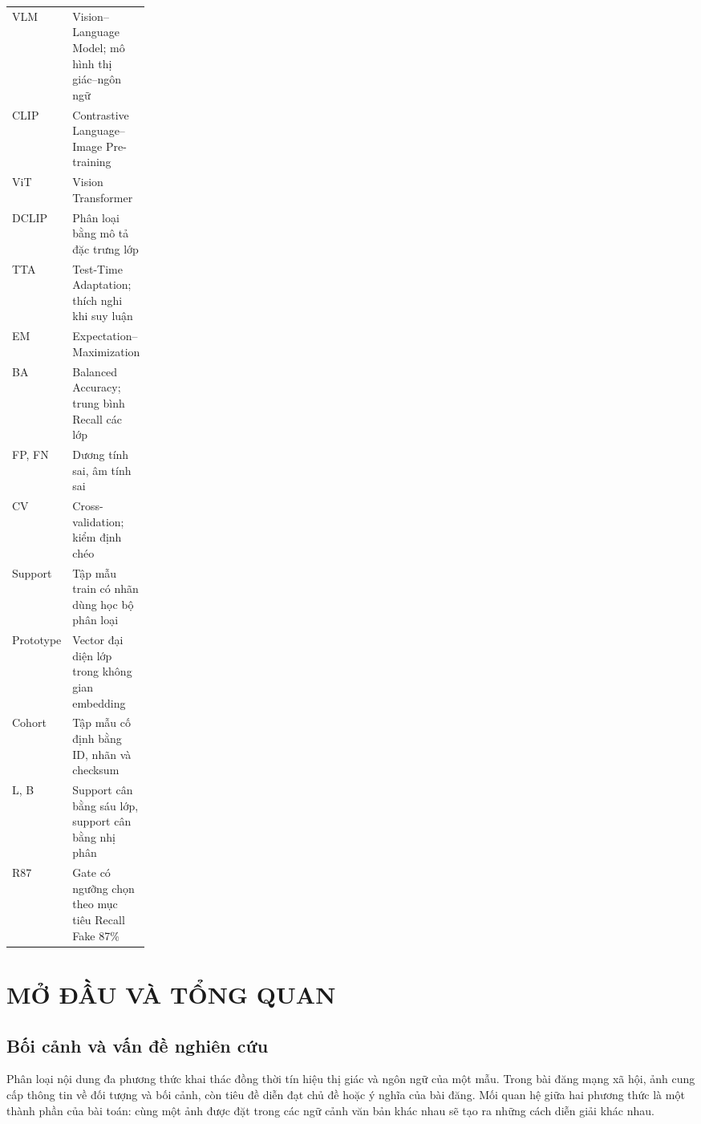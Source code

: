 \documentclass[12pt,a4paper]{article}
\newcommand{\Chapter}[1]{\clearpage\section{#1}}
\numberwithin{figure}{section}
\numberwithin{table}{section}
\numberwithin{equation}{section}
\newcommand{\DauTrangDau}[1]{\FrontHeading*{#1}}
\begin{document}
\DauTrangDau{DANH MỤC CÁC CHỮ VIẾT TẮT}
\begin{tabularx}{\linewidth}{@{}p{0.20\linewidth}L@{}}
\toprule
VLM & Vision--Language Model; mô hình thị giác--ngôn ngữ\\
CLIP & Contrastive Language--Image Pre-training\\
ViT & Vision Transformer\\
DCLIP & Phân loại bằng mô tả đặc trưng lớp\\
TTA & Test-Time Adaptation; thích nghi khi suy luận\\
EM & Expectation--Maximization\\
BA & Balanced Accuracy; trung bình Recall các lớp\\
FP, FN & Dương tính sai, âm tính sai\\
CV & Cross-validation; kiểm định chéo\\
Support & Tập mẫu train có nhãn dùng học bộ phân loại\\
Prototype & Vector đại diện lớp trong không gian embedding\\
Cohort & Tập mẫu cố định bằng ID, nhãn và checksum\\
L, B & Support cân bằng sáu lớp, support cân bằng nhị phân\\
R87 & Gate có ngưỡng chọn theo mục tiêu Recall Fake 87\%\\
\bottomrule
\end{tabularx}
\clearpage
{}



\Chapter{MỞ ĐẦU VÀ TỔNG QUAN}
\subsection{Bối cảnh và vấn đề nghiên cứu}
Phân loại nội dung đa phương thức khai thác đồng thời tín hiệu thị giác và ngôn ngữ của một mẫu. Trong bài đăng mạng xã hội, ảnh cung cấp thông tin về đối tượng và bối cảnh, còn tiêu đề diễn đạt chủ đề hoặc ý nghĩa của bài đăng. Mối quan hệ giữa hai phương thức là một thành phần của bài toán: cùng một ảnh được đặt trong các ngữ cảnh văn bản khác nhau sẽ tạo ra những cách diễn giải khác nhau.
\end{document}
